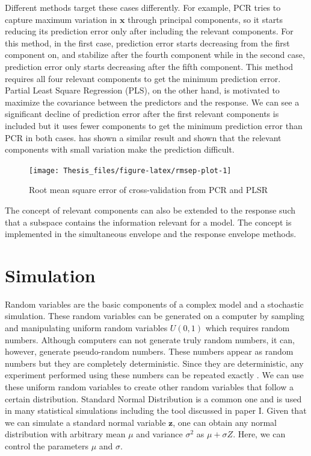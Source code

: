 \documentclass[11pt,twoside,openright,titlepage,
  headinclude,footinclude,BCOR=5mm,
  numbers=noenddot,cleardoublepage=empty,
  tablecaptionabove, dottedtoc,
  bibliography=totoc,paper=a4]{scrreprt}
\begin{document}
Different methods target these cases differently. For example, PCR tries to capture maximum variation in \(\mathbf{x}\) through principal components, so it starts reducing its prediction error only after including the relevant components. For this method, in the first case, prediction error starts decreasing from the first component on, and stabilize after the fourth component while in the second case, prediction error only starts decreasing after the fifth component. This method requires all four relevant components to get the minimum prediction error. Partial Least Square Regression (PLS), on the other hand, is motivated to maximize the covariance between the predictors and the response. We can see a significant decline of prediction error after the first relevant components is included but it uses fewer components to get the minimum prediction error than PCR in both cases. \citet{Helland1994b} has shown a similar result and shown that the relevant components with small variation make the prediction difficult.

\begin{figure}[!htb]
\texttt{[image: Thesis\_files/figure-latex/rmsep-plot-1]} \caption[]{Root mean square error of cross-validation from PCR and PLSR}\label{fig:rmsep-plot}
\end{figure}

The concept of relevant components can also be extended to the response such that a subspace contains the information relevant for a model. The concept is implemented in the simultaneous envelope \citep{cook2015simultaneous} and the response envelope \citep{cook2010envelope} methods.

\hypertarget{simulation}{%
\section{Simulation}\label{simulation}}

Random variables are the basic components of a complex model and a stochastic simulation. These random variables can be generated on a computer by sampling and manipulating uniform random variables \(U(0, 1)\) which requires random numbers. Although computers can not generate truly random numbers, it can, however, generate pseudo-random numbers. These numbers appear as random numbers but they are completely deterministic. Since they are deterministic, any experiment performed using these numbers can be repeated exactly \citep{jones2014introduction}. We can use these uniform random variables to create other random variables that follow a certain distribution. Standard Normal Distribution is a common one and is used in many statistical simulations including the tool discussed in paper I. Given that we can simulate a standard normal variable \(\mathbf{z}\), one can obtain any normal distribution with arbitrary mean \(\mu\) and variance \(\sigma^2\) as \(\mu + \sigma Z\). Here, we can control the parameters \(\mu\) and \(\sigma\).
\end{document}
